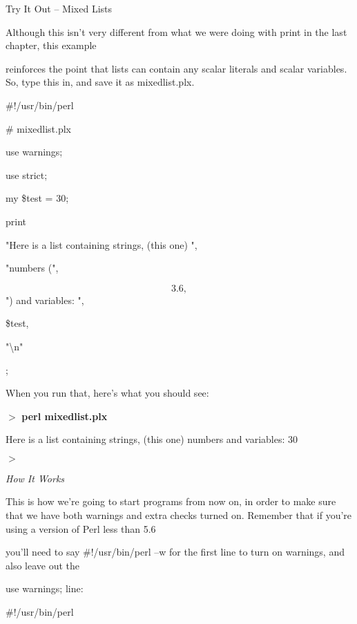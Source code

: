 \documentclass[a4paper,11pt]{book}
\begin{document}
\noindent 

\noindent Try It Out -- Mixed Lists

\noindent 

\noindent Although this isn't very different from what we were doing with print in the last chapter, this example

\noindent reinforces the point that lists can contain any scalar literals and scalar variables. So, type this in, and save it as mixedlist.plx.

\noindent 

\noindent \#!/usr/bin/perl

\noindent \# mixedlist.plx

\noindent use warnings;

\noindent use strict;

\noindent 

\noindent my \$test = 30;

\noindent print

\noindent "Here is a list containing strings, (this one) ",

\noindent "numbers (",

\[3.6,\] 
") and variables: ",

\noindent \$test,

\noindent "\textbackslash n"

\noindent ;

\noindent 

\noindent When you run that, here's what you should see:

\noindent 

\noindent $>$ \textbf{perl mixedlist.plx}

\noindent Here is a list containing strings, (this one) numbers and variables: 30

\noindent $>$

\noindent 

\noindent \textit{How It Works}

\noindent This is how we're going to start programs from now on, in order to make sure that we have both warnings and extra checks turned on. Remember that if you're using a version of Perl less than 5.6

\noindent you'll need to say \#!/usr/bin/perl --w for the first line to turn on warnings, and also leave out the

\noindent use warnings; line:

\noindent 

\noindent \#!/usr/bin/perl
\end{document}
